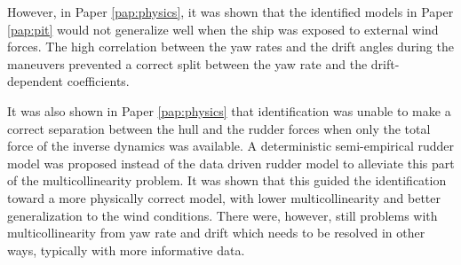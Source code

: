 However, in Paper \ref{pap:physics}, it was shown that the identified models in Paper \ref{pap:pit} would not generalize well when the ship was exposed to external wind forces. The high correlation between the yaw rates and the drift angles during the maneuvers prevented a correct split between the yaw rate and the drift-dependent coefficients.

It was also shown in Paper \ref{pap:physics} that identification was unable to make a correct separation between the hull and the rudder forces when only the total force of the inverse dynamics was available. 
A deterministic semi-empirical rudder model was proposed instead of the data driven rudder model to alleviate this part of the multicollinearity problem. It was shown that this guided the identification toward a more physically correct model, with lower multicollinearity and better generalization to the wind conditions. There were, however, still problems with multicollinearity from yaw rate and drift which needs to be resolved in other ways, typically with more informative data. 
